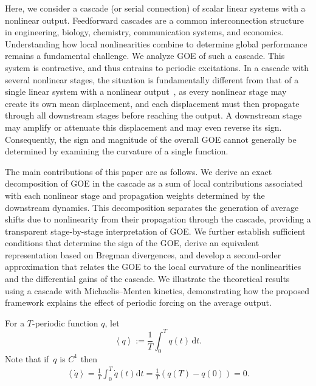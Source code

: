 \documentclass[onecolumn]{IEEEtran}
\newcommand{\avg}[1]{\left\langle #1\right\rangle}
\begin{document}
Here, we consider   a   cascade (or serial connection) of scalar linear systems with a nonlinear output. Feedforward cascades are a common interconnection structure in engineering, biology, chemistry, communication systems,  and economics.
Understanding how local nonlinearities combine to determine global performance remains a fundamental challenge. 
We analyze GOE of such a cascade. 
This system is contractive, and thus entrains to periodic excitations.   
In a cascade with several nonlinear
stages, the situation is fundamentally different from that of  a single linear system with a nonlinear output~\cite{MassasMargaliot_linear_sys_nonlin_output},
as every nonlinear
stage may create its own mean displacement, and each displacement must then
propagate through all downstream stages before reaching the output.
A downstream stage may amplify or attenuate this displacement and may even reverse its sign. Consequently, the sign and magnitude
of the overall GOE cannot generally be determined by examining the curvature
of a single function.

 The main contributions of this paper are as follows. We derive an exact decomposition of  GOE in the cascade as  a sum of local contributions associated with each nonlinear stage and propagation weights determined by the downstream dynamics. This decomposition separates the generation of average shifts due to nonlinearity from their propagation through the cascade, providing a transparent stage-by-stage interpretation of GOE. We further establish sufficient conditions that determine the sign of the GOE, derive an equivalent representation based on Bregman divergences, and develop a second-order approximation that relates the GOE to the local curvature of the nonlinearities and the differential gains of the cascade. We illustrate the theoretical results  using  a cascade with Michaelis--Menten kinetics, demonstrating how the proposed framework explains the effect of periodic forcing on the average output.
 
For a $T$-periodic  function $q$,   let 
\[ 
    \avg q
    :=
    \frac{1}{T}\int_0^T q(t)\,\mathrm{d}t.
\]
Note that if~$q$  is $C^1$ then
 \begin{align}
     \label{eq:avgderiszero}
 \avg{\dot q}=\frac{1}{T}\int_0^T \dot q(t) \mathrm{d}t =\frac1{T}(q(T)-q(0) )=0. 
\end{align}

 
\end{document}
